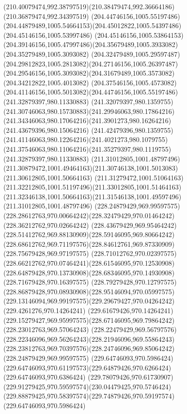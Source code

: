 {{  \curveto(210.40079474,992.38797519)(210.38479474,992.36664186)(210.36879474,992.34397519)
  \moveto(204.44746156,1005.55197486)
  \curveto(204.44879489,1005.54664153)(204.45012822,1005.54397486)(204.45146156,1005.53997486)
  \lineto(204.45146156,1005.53864153)
  \curveto(204.39146156,1005.47997486)(204.35679489,1005.3933082)(204.35279489,1005.3093082)
  \curveto(204.32479489,1005.29597487)(204.29812823,1005.2813082)(204.27146156,1005.26397487)
  \curveto(204.29546156,1005.3093082)(204.31679489,1005.3573082)(204.34212822,1005.4013082)
  \curveto(204.37546156,1005.4573082)(204.41146156,1005.5013082)(204.44746156,1005.55197486)
  \moveto(241.32879397,980.11330883)
  \curveto(241.32079397,980.1359755)(241.30746063,980.15730883)(241.29946063,980.17864216)
  \curveto(241.34346063,980.17064216)(241.3901273,980.16264216)(241.43679396,980.15064216)
  \curveto(241.42479396,980.1359755)(241.41146063,980.12264216)(241.4021273,980.1079755)
  \curveto(241.37546063,980.11064216)(241.35279397,980.1119755)(241.32879397,980.11330883)
  \moveto(211.31012805,1001.48797496)
  \curveto(211.30879472,1001.49464163)(211.30746138,1001.5013083)(211.30612805,1001.50664163)
  \curveto(211.31279472,1001.51064163)(211.32212805,1001.51197496)(211.33012805,1001.51464163)
  \curveto(211.32346138,1001.50664163)(211.31546138,1001.49597496)(211.31012805,1001.48797496)
  \moveto(228.24879429,969.99597575)
  \curveto(228.28612763,970.00664242)(228.32479429,970.01464242)(228.36212762,970.02664242)
  \curveto(228.43679429,969.95464242)(228.51412762,969.88130909)(228.59146095,969.80664242)
  \curveto(228.68612762,969.71197576)(228.84612761,969.87330909)(228.75679428,969.97197575)
  \curveto(228.71012762,970.02397575)(228.66212762,970.07464241)(228.61546095,970.12530908)
  \curveto(228.64879428,970.13730908)(228.68346095,970.14930908)(228.71679428,970.16397575)
  \curveto(228.79279428,970.12797575)(228.86879428,970.08930908)(228.95146094,970.05997575)
  \curveto(229.13146094,969.99197575)(229.29679427,970.04264242)(229.4261276,970.14264241)
  \lineto(229.61679426,970.14264241)
  \curveto(229.15279427,969.95997575)(228.67146095,969.79864242)(228.23012763,969.57064243)
  \curveto(228.22479429,969.56797576)(228.22346096,969.56264243)(228.21946096,969.55864243)
  \curveto(228.23812763,969.70397576)(228.24746096,969.85064242)(228.24879429,969.99597575)
  \moveto(229.64746093,970.5986424)
  \curveto(229.64746093,970.61197573)(229.64879426,970.6266424)(229.64746093,970.6386424)
  \curveto(229.78079426,970.61730907)(229.91279425,970.59597574)(230.04479425,970.5746424)
  \curveto(229.88879425,970.58397574)(229.74879426,970.59197574)(229.64746093,970.5986424)
}}
